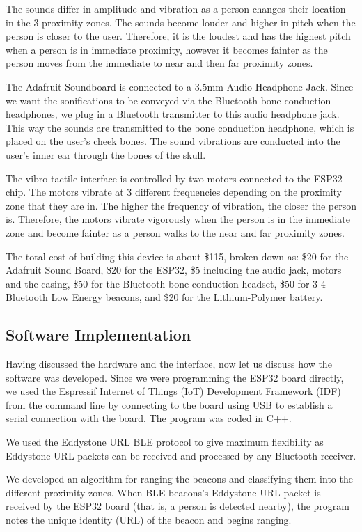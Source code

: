 The sounds differ in amplitude and vibration as a person changes their location in the 3 proximity zones. The sounds become louder and higher in pitch when the person is closer to the user. Therefore, it is the loudest and has the highest pitch when a person is in immediate proximity, however it becomes fainter as the person moves from the immediate to near and then far proximity zones. 
 
The Adafruit Soundboard is connected to a 3.5mm Audio Headphone Jack. Since we want the sonifications to be conveyed via the Bluetooth bone-conduction headphones, we plug in a Bluetooth transmitter to this audio headphone jack. This way the sounds are transmitted to the bone conduction headphone, which is placed on the user's cheek bones. The sound vibrations are conducted into the user's inner ear through the bones of the skull.
 
The vibro-tactile interface is controlled by two motors connected to the ESP32 chip. The motors vibrate at 3 different frequencies depending on the proximity zone that they are in. The higher the frequency of vibration, the closer the person is. Therefore, the motors vibrate vigorously when the person is in the immediate zone and become fainter as a person walks to the near and far proximity zones. 

The total cost of building this device is about \$115, broken down as: \$20 for the Adafruit Sound Board, \$20 for the ESP32, \$5 including the audio jack, motors and the casing, \$50 for the Bluetooth bone-conduction headset, \$50 for 3-4 Bluetooth Low Energy beacons, and \$20 for the Lithium-Polymer battery.

\subsection{Software Implementation}

Having discussed the hardware and the interface, now let us discuss how the software was developed. Since we were programming the ESP32 board directly, we used the Espressif Internet of Things (IoT) Development Framework (IDF) from the command line by connecting to the board using USB to establish a serial connection with the board.  The program was coded in C++. 

We used the Eddystone URL BLE protocol to give maximum flexibility as Eddystone URL packets can be received and processed by any Bluetooth receiver.

We developed an algorithm for ranging the beacons and classifying them into the different proximity zones. When BLE beacons's Eddystone URL packet  is received by the ESP32 board (that is, a person is detected nearby), the program notes the unique identity (URL) of the beacon and begins ranging.  

